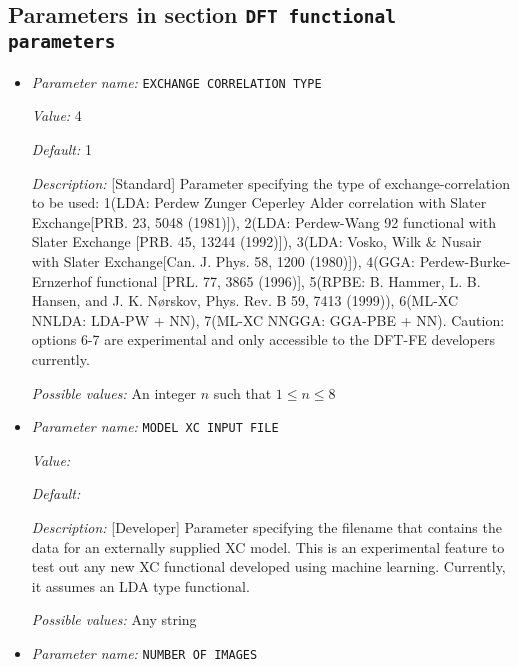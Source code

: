 \subsection{Parameters in section \tt DFT functional parameters}
\label{parameters:DFT_20functional_20parameters}

\begin{itemize}
\item {\it Parameter name:} {\tt EXCHANGE CORRELATION TYPE}
\label{parameters:DFT functional parameters/EXCHANGE CORRELATION TYPE}
\label{parameters:DFT_20functional_20parameters/EXCHANGE_20CORRELATION_20TYPE}


{\it Value:} 4


{\it Default:} 1


{\it Description:} [Standard] Parameter specifying the type of exchange-correlation to be used: 1(LDA: Perdew Zunger Ceperley Alder correlation with Slater Exchange[PRB. 23, 5048 (1981)]), 2(LDA: Perdew-Wang 92 functional with Slater Exchange [PRB. 45, 13244 (1992)]), 3(LDA: Vosko, Wilk \& Nusair with Slater Exchange[Can. J. Phys. 58, 1200 (1980)]), 4(GGA: Perdew-Burke-Ernzerhof functional [PRL. 77, 3865 (1996)], 5(RPBE: B. Hammer, L. B. Hansen, and J. K. Nørskov, Phys. Rev. B 59, 7413 (1999)), 6(ML-XC NNLDA: LDA-PW + NN), 7(ML-XC NNGGA: GGA-PBE + NN). Caution: options 6-7 are experimental and only accessible to the DFT-FE developers currently.


{\it Possible values:} An integer $n$ such that $1\leq n \leq 8$
\item {\it Parameter name:} {\tt MODEL XC INPUT FILE}
\label{parameters:DFT functional parameters/MODEL XC INPUT FILE}
\label{parameters:DFT_20functional_20parameters/MODEL_20XC_20INPUT_20FILE}


{\it Value:} 


{\it Default:} 


{\it Description:} [Developer] Parameter specifying the filename that contains the data for an externally supplied XC model. This is an experimental feature to test out any new XC functional developed using machine learning. Currently, it assumes an LDA type functional.


{\it Possible values:} Any string
\item {\it Parameter name:} {\tt NUMBER OF IMAGES}
\label{parameters:DFT functional parameters/NUMBER OF IMAGES}
\label{parameters:DFT_20functional_20parameters/NUMBER_20OF_20IMAGES}



\end{itemize}

